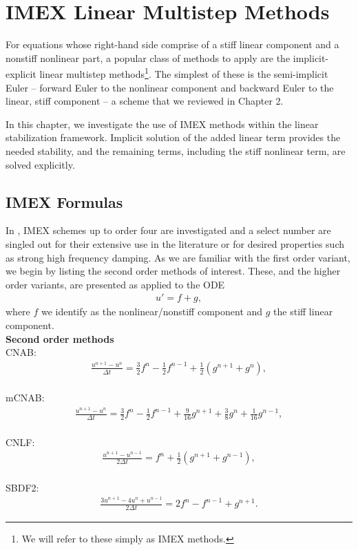 \chapter{IMEX Linear Multistep Methods}
\label{LMM}
For equations whose right-hand side comprise of a stiff linear component and a nonstiff nonlinear part, a popular class of methods to apply are the implicit-explicit linear multistep methods\footnote{We will refer to these simply as IMEX methods.}. The simplest of these is the semi-implicit Euler -- forward Euler to the nonlinear component and backward Euler to the linear, stiff component -- a scheme that we reviewed in Chapter 2. 

In this chapter, we investigate the use of IMEX methods within the linear stabilization framework. Implicit solution of the added linear term provides the needed stability, and the remaining terms, including the stiff nonlinear term, are solved explicitly.

\section{IMEX Formulas}
In \cite{ascher1995implicit}, IMEX schemes up to order four are investigated and a select number are singled out for their extensive use in the literature or for desired properties such as strong high frequency damping. As we are familiar with the first order variant, we begin by listing the second order methods of interest. These, and the higher order variants, are presented as applied to the ODE 
\begin{align*}
u' = f + g, 
\end{align*}
where $f$ we identify as the nonlinear/nonstiff component and $g$ the stiff linear component. 
\\ \noindent
\textbf{Second order methods}\\
CNAB:
\begin{align}
\frac{u^{n+1}-u^n}{\Delta t} 
= \frac{3}{2} f^n - \frac{1}{2}f^{n-1} 
+ \frac{1}{2}(g^{n+1} + g^n), 
\label{cnab}
\end{align}\\
mCNAB:
\begin{align}
\frac{u^{n+1}-u^n}{\Delta t} 
= \frac{3}{2}f^n - \frac{1}{2} f^{n-1}
+ \frac{9}{16}g^{n+1} 
+ \frac{3}{8}g^n
+ \frac{1}{16}g^{n-1},
\label{mcnab}
\end{align}
\\
CNLF:
\begin{align}
\frac{u^{n+1}-u^{n-1}}{2\Delta t}
= f^n + \frac{1}{2}(g^{n+1} + g^{n-1}),
\label{cnlf}
\end{align} \\
SBDF2:
\begin{align}
\frac{3u^{n+1}-4u^n+u^{n-1}}{2\Delta t} 
= 2f^n - f^{n-1} + g^{n+1}.
\label{sbdf2}
\end{align}

